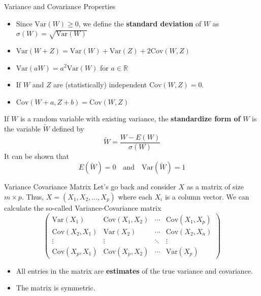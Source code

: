 \documentclass{beamer}
\begin{document}
\begin{frame}{Variance and Covariance Properties}
	\begin{itemize}
		\item Since $\textrm{Var}(W) \ge 0$, we define the {\bf standard deviation} of $W$ as $\sigma(W)=\sqrt{\textrm{Var}(W)}$
		\item $\textrm{Var}(W+Z)= \textrm{Var}(W)+ \textrm{Var}(Z)+2 \textrm{Cov}(W,Z)$
		\item $\textrm{Var}(aW)= a^2 \textrm{Var}(W)$ for $a \in \mathbb{R}$
		\item If $W$ and $Z$ are (statistically) independent $\textrm{Cov}(W,Z)= 0$.
		\item $\textrm{Cov}(W+a,Z+b)= \textrm{Cov}(W,Z)$
	\end{itemize}
	
	If $W$ is a random variable with existing variance, the {\bf standardize form of } $W$ is the variable $\tilde{W}$ defined by 
	\begin{equation*}
		\tilde{W}= \frac{W - E(W)}{\sigma(W)}
	\end{equation*}
It can be shown that
\begin{equation*}
	E(\tilde{W})=0 \quad \textrm{and} \quad \textrm{Var}(\tilde{W})= 1
\end{equation*}
\end{frame}

\begin{frame}{Variance Covariance Matrix}
	Let's go back and consider $X$ as a matrix of size $m \times p$.
	Thus, $X=(X_1, X_2, \ldots, X_p)$ where each $X_i$ is a column vector. We can calculate the so-called Variance-Covariance matrix
	\begin{equation*}
		\begin{pmatrix}
			\textrm{Var}(X_1) & \textrm{Cov}(X_1,X_2) & \cdots & \textrm{Cov}(X_1,X_p) \\
			\textrm{Cov}(X_2,X_1) & \textrm{Var}(X_2) & \cdots & \textrm{Cov}(X_2,X_n) \\
			\vdots & \vdots & \ddots & \vdots\\
			\textrm{Cov}(X_p,X_1) & \textrm{Cov}(X_p,X_2) & \cdots & \textrm{Var}(X_p)
		\end{pmatrix}
	\end{equation*}

\begin{itemize}
	\item All entries in the matrix are {\bf estimates} of the true variance and covariance.
	\item The matrix is symmetric.
\end{itemize} 
\end{frame}
\end{document}
